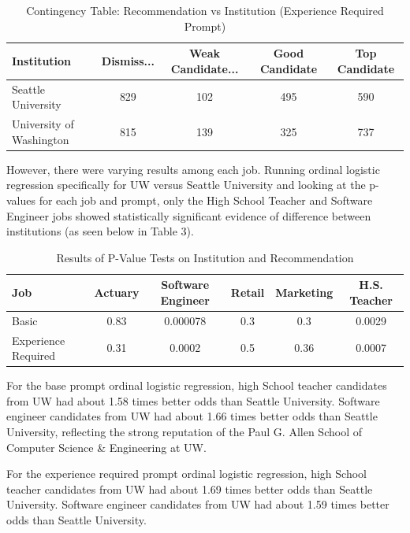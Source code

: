 \documentclass[11pt,letterpaper]{article}
\begin{document}
\begin{table}[h]
\centering
\caption{Contingency Table: Recommendation vs Institution (Experience Required Prompt)}
\begin{tabular}{lcccc}
\hline
\textbf{Institution} & \textbf{Dismiss...} & \textbf{Weak Candidate...} & \textbf{Good Candidate} & \textbf{Top Candidate} \\
\hline
Seattle University & 829 & 102 & 495 & 590 \\
University of Washington & 815 & 139 & 325 & 737 \\
\hline
\end{tabular}
\end{table}

However, there were varying results among each job. Running ordinal logistic regression specifically for UW versus Seattle University and looking at the p-values for each job and prompt, only the High School Teacher and Software Engineer jobs showed statistically significant evidence of difference between institutions (as seen below in Table 3). 




 
\begin{table}[h]
\centering
\caption{Results of P-Value Tests on Institution and Recommendation}
\begin{tabular}{lccccc}
\hline
\textbf{Job} & \textbf{Actuary} & \textbf{Software Engineer} & \textbf{Retail} & \textbf{Marketing} & \textbf{H.S. Teacher}\\
\hline
Basic & 0.83 & 0.000078 & 0.3 & 0.3 & 0.0029 \\
Experience Required & 0.31 & 0.0002 & 0.5 & 0.36 & 0.0007 \\
\hline
\end{tabular}
\end{table}


For the base prompt ordinal logistic regression, high School teacher candidates from UW had about 1.58 times better odds than Seattle University. Software engineer candidates from UW had about 1.66 times better odds than Seattle University, reflecting the strong reputation of the Paul G. Allen School of Computer Science \& Engineering at UW.


For the experience required prompt ordinal logistic regression, high School teacher candidates from UW had about 1.69 times better odds than Seattle University. Software engineer candidates from UW had about 1.59 times better odds than Seattle University.
\end{document}
